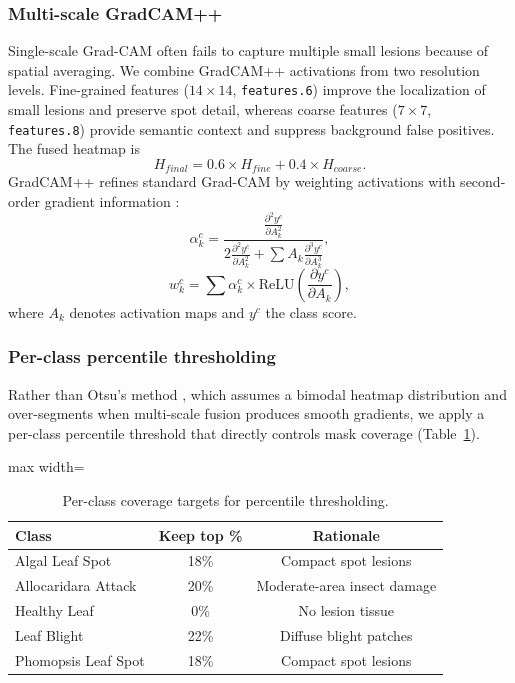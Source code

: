 \documentclass[final,5p,times,twocolumn,authoryear]{elsarticle}
\begin{document}
\subsubsection{Multi-scale GradCAM++}

Single-scale Grad-CAM often fails to capture multiple small lesions because of spatial averaging. We combine GradCAM++ activations from two resolution levels. Fine-grained features ($14\times14$, \texttt{features.6}) improve the localization of small lesions and preserve spot detail, whereas coarse features ($7\times7$, \texttt{features.8}) provide semantic context and suppress background false positives. The fused heatmap is
\begin{equation}
H_{final} = 0.6 \times H_{fine} + 0.4 \times H_{coarse}.
\end{equation}
GradCAM++ refines standard Grad-CAM by weighting activations with second-order gradient information \citep{chattopadhay2018grad}:
\begin{equation}
\alpha_k^c = \frac{\frac{\partial^2 y^c}{\partial A_k^2}}{2\frac{\partial^2 y^c}{\partial A_k^2} + \sum A_k \frac{\partial^3 y^c}{\partial A_k^3}},
\end{equation}
\begin{equation}
w_k^c = \sum \alpha_k^c \times \text{ReLU}\left(\frac{\partial y^c}{\partial A_k}\right),
\end{equation}
where $A_k$ denotes activation maps and $y^c$ the class score.

\subsubsection{Per-class percentile thresholding}

Rather than Otsu's method \citep{otsu1979threshold}, which assumes a bimodal heatmap distribution and over-segments when multi-scale fusion produces smooth gradients, we apply a per-class percentile threshold that directly controls mask coverage (Table~\ref{tab:percentile}).

\begin{table}[!htbp]
\centering
\caption{Per-class coverage targets for percentile thresholding.}
\label{tab:percentile}
\begin{adjustbox}{max width=\columnwidth}
\begin{tabular}{lcc}
\toprule
\textbf{Class} & \textbf{Keep top \%} & \textbf{Rationale} \\
\midrule
Algal Leaf Spot     & 18\% & Compact spot lesions \\
Allocaridara Attack & 20\% & Moderate-area insect damage \\
Healthy Leaf        & 0\%  & No lesion tissue \\
Leaf Blight         & 22\% & Diffuse blight patches \\
Phomopsis Leaf Spot & 18\% & Compact spot lesions \\
\bottomrule
\end{tabular}
\end{adjustbox}
\end{table}
\end{document}
